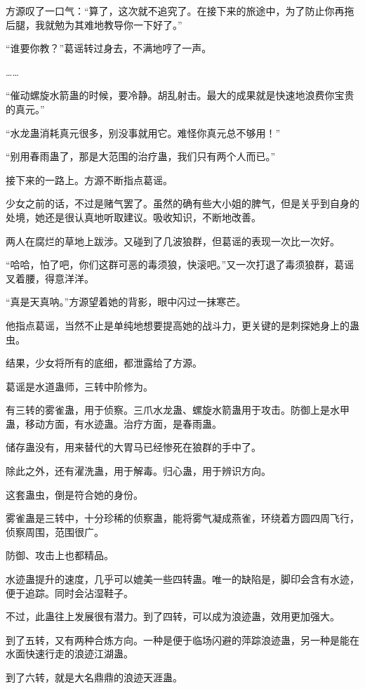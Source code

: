 \begin{this_body}
方源叹了一口气：“算了，这次就不追究了。在接下来的旅途中，为了防止你再拖后腿，我就勉为其难地教导你一下好了。”

“谁要你教？”葛谣转过身去，不满地哼了一声。

……

“催动螺旋水箭蛊的时候，要冷静。胡乱射击。最大的成果就是快速地浪费你宝贵的真元。”

“水龙蛊消耗真元很多，别没事就用它。难怪你真元总不够用！”

“别用春雨蛊了，那是大范围的治疗蛊，我们只有两个人而已。”

接下来的一路上。方源不断指点葛谣。

少女之前的话，不过是赌气罢了。虽然的确有些大小姐的脾气，但是关乎到自身的处境，她还是很认真地听取建议。吸收知识，不断地改善。

两人在腐烂的草地上跋涉。又碰到了几波狼群，但葛谣的表现一次比一次好。

“哈哈，怕了吧，你们这群可恶的毒须狼，快滚吧。”又一次打退了毒须狼群，葛谣叉着腰，得意洋洋。

“真是天真呐。”方源望着她的背影，眼中闪过一抹寒芒。

他指点葛谣，当然不止是单纯地想要提高她的战斗力，更关键的是刺探她身上的蛊虫。

结果，少女将所有的底细，都泄露给了方源。

葛谣是水道蛊师，三转中阶修为。

有三转的雾雀蛊，用于侦察。三爪水龙蛊、螺旋水箭蛊用于攻击。防御上是水甲蛊，移动方面，有水迹蛊。治疗方面，是春雨蛊。

储存蛊没有，用来替代的大胃马已经惨死在狼群的手中了。

除此之外，还有濯洗蛊，用于解毒。归心蛊，用于辨识方向。

这套蛊虫，倒是符合她的身份。

雾雀蛊是三转中，十分珍稀的侦察蛊，能将雾气凝成燕雀，环绕着方圆四周飞行，侦察周围，范围很广。

防御、攻击上也都精品。

水迹蛊提升的速度，几乎可以媲美一些四转蛊。唯一的缺陷是，脚印会含有水迹，便于追踪。同时会沾湿鞋子。

不过，此蛊往上发展很有潜力。到了四转，可以成为浪迹蛊，效用更加强大。

到了五转，又有两种合炼方向。一种是便于临场闪避的萍踪浪迹蛊，另一种是能在水面快速行走的浪迹江湖蛊。

到了六转，就是大名鼎鼎的浪迹天涯蛊。


\end{this_body}
